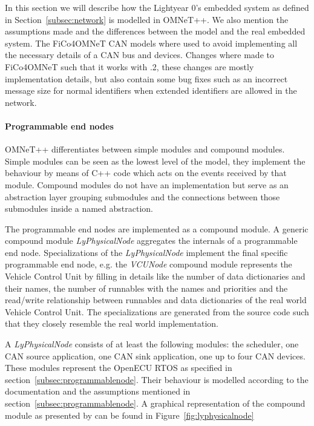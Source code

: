 \label{subsec:moddeling}
In this section we will describe how the Lightyear 0's embedded system as defined in Section~\ref{subsec:network} is modelled in OMNeT++. We also mention the assumptions made and the differences between the model and the real embedded system. The FiCo4OMNeT CAN models where used to avoid implementing all the necessary details of a CAN bus and devices. Changes where made to FiCo4OMNeT such that it works with .2, these changes are mostly implementation details, but also contain some bug fixes such as an incorrect message size for normal identifiers when extended identifiers are allowed in the network.

\paragraph{Programmable end nodes} OMNeT++ differentiates between simple modules and compound modules. Simple modules can be seen as the lowest level of the model, they implement the behaviour by means of C++ code which acts on the events received by that module. Compound modules do not have an implementation but serve as an abstraction layer grouping submodules and the connections between those submodules inside a named abstraction.

The programmable end nodes are implemented as a compound module. A generic compound module \textit{LyPhysicalNode} aggregates the internals of a programmable end node. Specializations of the \textit{LyPhysicalNode} implement the final specific programmable end node, e.g. the \textit{VCUNode} compound module represents the Vehicle Control Unit by filling in details like the number of data dictionaries and their names, the number of runnables with the names and priorities and the read/write relationship between runnables and data dictionaries of the real world Vehicle Control Unit. The specializations are generated from the source code such that they closely resemble the real world implementation. 

A \textit{LyPhysicalNode} consists of at least the following modules: the scheduler, one CAN source application, one CAN sink application, one up to four CAN devices. These modules represent the OpenECU RTOS as specified in section~\ref{subsec:programmablenode}. Their behaviour is modelled according to the documentation and the assumptions mentioned in section~\ref{subsec:programmablenode}. A graphical representation of the compound module as presented by \omnet can be found in Figure~\ref{fig:lyphysicalnode}

